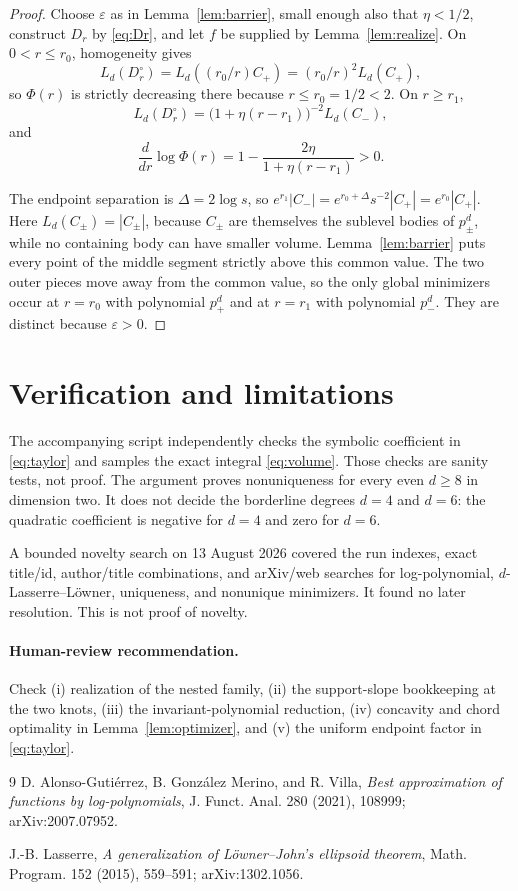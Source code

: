 \documentclass[11pt]{article}
\newcommand{\eps}{\varepsilon}
\begin{document}
\begin{proof}
Choose $\eps$ as in Lemma~\ref{lem:barrier}, small enough also that
$\eta<1/2$, construct $D_r$ by \eqref{eq:Dr}, and let $f$ be supplied by
Lemma~\ref{lem:realize}.  On $0<r\leq r_0$, homogeneity gives
\[
 L_d(D_r^\circ)=L_d((r_0/r)C_+)=(r_0/r)^2L_d(C_+),
\]
so $\Phi(r)$ is strictly decreasing there because $r\leq r_0=1/2<2$.
On $r\geq r_1$,
\[
 L_d(D_r^\circ)=\bigl(1+\eta(r-r_1)\bigr)^{-2}L_d(C_-),
\]
and
\[
 \frac{d}{dr}\log\Phi(r)
 =1-\frac{2\eta}{1+\eta(r-r_1)}>0.
\]

The endpoint separation is $\Delta=2\log s$, so
$e^{r_1}|C_-|=e^{r_0+\Delta}s^{-2}|C_+|=e^{r_0}|C_+|$.
Here $L_d(C_\pm)=|C_\pm|$, because $C_\pm$ are themselves the sublevel
bodies of $p_\pm^d$, while no containing body can have smaller volume.
Lemma~\ref{lem:barrier} puts every point of the middle segment strictly above
this common value.  The two outer pieces
move away from the common value, so the only global minimizers occur at
$r=r_0$ with polynomial $p_+^d$ and at $r=r_1$ with polynomial $p_-^d$.
They are distinct because $\eps>0$.
\end{proof}

\section{Verification and limitations}

The accompanying script independently checks the symbolic coefficient in
\eqref{eq:taylor} and samples the exact integral \eqref{eq:volume}.  Those
checks are sanity tests, not proof.  The argument proves nonuniqueness for
every even $d\geq8$ in dimension two.  It does not decide the borderline
degrees $d=4$ and $d=6$: the quadratic coefficient is negative for $d=4$ and
zero for $d=6$.

A bounded novelty search on 13 August 2026 covered the run indexes, exact
title/id, author/title combinations, and arXiv/web searches for
log-polynomial, $d$-Lasserre--L\"owner, uniqueness, and nonunique minimizers.
It found no later resolution.  This is not proof of novelty.

\paragraph{Human-review recommendation.}
Check (i) realization of the nested family, (ii) the support-slope bookkeeping
at the two knots, (iii) the invariant-polynomial reduction, (iv) concavity and
chord optimality in Lemma~\ref{lem:optimizer}, and (v) the uniform endpoint
factor in \eqref{eq:taylor}.

\begin{thebibliography}{9}
D. Alonso-Guti\'errez, B. Gonz\'alez Merino, and R. Villa,
\emph{Best approximation of functions by log-polynomials},
J. Funct. Anal. 280 (2021), 108999; arXiv:2007.07952.

J.-B. Lasserre,
\emph{A generalization of L\"owner--John's ellipsoid theorem},
Math. Program. 152 (2015), 559--591; arXiv:1302.1056.
\end{thebibliography}
\end{document}
